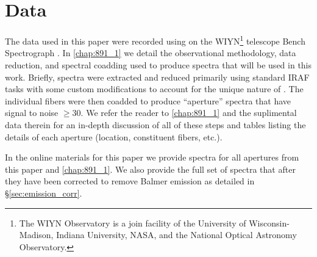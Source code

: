 \section{Data}
\label{891_2:sec:data}
The data used in this paper were recorded using \GP \citep{Wood12} on
the WIYN\footnote{The WIYN Observatory is a join facility of the
  University of Wisconsin-Madison, Indiana University, NASA, and the
  National Optical Astronomy Observatory.} telescope Bench
Spectrograph \citep{Barden94,Bershady08,Knezek10}. In
\ref{chap:891_1} we detail the observational methodology,
data reduction, and spectral coadding used to produce spectra that
will be used in this work. Briefly, spectra were extracted and reduced
primarily using standard IRAF tasks with some custom modifications to
account for the unique nature of \GP. The individual fibers were then
coadded to produce ``aperture'' spectra that have signal to noise
$\geq 30$. We refer the reader to \ref{chap:891_1} and the
suplimental data therein for an in-depth discussion of all of these
steps and tables listing the details of each aperture (location,
constituent fibers, etc.).

In the online materials for this paper we provide spectra for all
apertures from this paper and \ref{chap:891_1}. We also
provide the full set of spectra that after they have been corrected to
remove Balmer emission as detailed in \S\ref{sec:emission_corr}.

